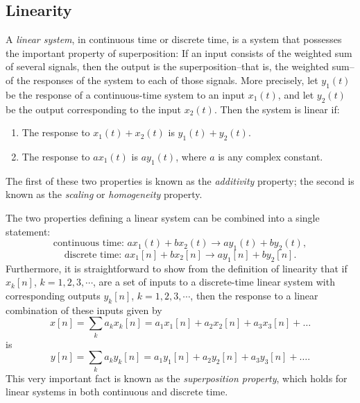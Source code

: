 \documentclass[a4paper,10pt,twoside]{book}
\begin{document}
\subsection{Linearity}

A \textit{linear system}, in continuous time or discrete time, is a system that possesses the important property of superposition: If an input consists of the weighted sum of several signals, then the output is the superposition--that is, the weighted sum--of the responses of the system to each of those signals. More precisely, let $y_1(t)$ be the response of a continuous-time system to an input $x_1(t)$, and let $y_2(t)$ be the output corresponding to the input $x_2(t)$. Then the system is linear if:
\begin{enumerate}
    \item The response to $x_1(t)+x_2(t)$ is $y_1(t)+y_2(t)$.
    \item The response to $ax_1(t)$ is $ay_1(t)$, where $a$ is any complex constant.
\end{enumerate}
The first of these two properties is known as the \textit{additivity} property; the second is known as the \textit{scaling} or \textit{homogeneity} property.

The two properties defining a linear system can be combined into a single statement:
\begin{equation}
    \text{continuous time: }ax_1(t)+bx_2(t)\to ay_1(t)+by_2(t),
    \label{1.121}
\end{equation}
\begin{equation}
    \text{discrete time: }ax_1[n]+bx_2[n]\to ay_1[n]+by_2[n].
    \label{1.122}
\end{equation}
Furthermore, it is straightforward to show from the definition of linearity that if $x_k[n]$, $k=1,2,3,\cdots$, are a set of inputs to a discrete-time linear system with corresponding outputs $y_k[n]$, $k=1,2,3,\cdots$, then the response to a linear combination of these inputs given by
\begin{equation}
    x[n]=\sum_{k}a_{k}x_{k}[n]=a_{1}x_{1}[n]+a_{2}x_{2}[n]+a_{3}x_{3}[n]+\ldots
    \label{1.123}
\end{equation}
is
\begin{equation}
    y[n]=\sum_{k}a_{k}y_{k}[n]=a_{1}y_{1}[n]+a_{2}y_{2}[n]+a_{3}y_{3}[n]+\ldots.
    \label{1.124}
\end{equation}
This very important fact is known as the \textit{superposition property}, which holds for linear systems in both continuous and discrete time.
\end{document}
